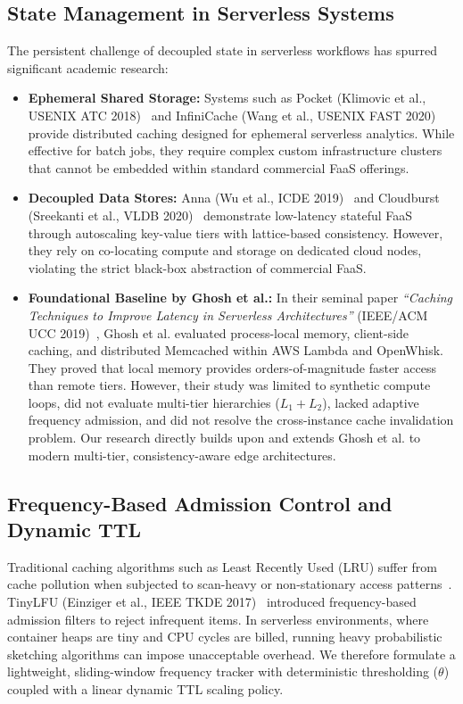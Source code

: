 \documentclass[conference]{IEEEtran}
\begin{document}
\subsection{State Management in Serverless Systems}
The persistent challenge of decoupled state in serverless workflows has spurred significant academic research:
\begin{itemize}
    \item \textbf{Ephemeral Shared Storage:} Systems such as Pocket (Klimovic et al., USENIX ATC 2018)~\cite{klimovic2018} and InfiniCache (Wang et al., USENIX FAST 2020)~\cite{wang2020infinicache} provide distributed caching designed for ephemeral serverless analytics. While effective for batch jobs, they require complex custom infrastructure clusters that cannot be embedded within standard commercial FaaS offerings.
    \item \textbf{Decoupled Data Stores:} Anna (Wu et al., ICDE 2019)~\cite{wu2019anna} and Cloudburst (Sreekanti et al., VLDB 2020)~\cite{sreekanti2020} demonstrate low-latency stateful FaaS through autoscaling key-value tiers with lattice-based consistency. However, they rely on co-locating compute and storage on dedicated cloud nodes, violating the strict black-box abstraction of commercial FaaS.
    \item \textbf{Foundational Baseline by Ghosh et al.:} In their seminal paper \textit{``Caching Techniques to Improve Latency in Serverless Architectures''} (IEEE/ACM UCC 2019)~\cite{ghosh2019}, Ghosh et al. evaluated process-local memory, client-side caching, and distributed Memcached within AWS Lambda and OpenWhisk. They proved that local memory provides orders-of-magnitude faster access than remote tiers. However, their study was limited to synthetic compute loops, did not evaluate multi-tier hierarchies ($L_1 + L_2$), lacked adaptive frequency admission, and did not resolve the cross-instance cache invalidation problem. Our research directly builds upon and extends Ghosh et al. to modern multi-tier, consistency-aware edge architectures.
\end{itemize}

\subsection{Frequency-Based Admission Control and Dynamic TTL}
Traditional caching algorithms such as Least Recently Used (LRU) suffer from cache pollution when subjected to scan-heavy or non-stationary access patterns~\cite{megiddo2003arc}. TinyLFU (Einziger et al., IEEE TKDE 2017)~\cite{einziger2017tinylfu} introduced frequency-based admission filters to reject infrequent items. In serverless environments, where container heaps are tiny and CPU cycles are billed, running heavy probabilistic sketching algorithms can impose unacceptable overhead. We therefore formulate a lightweight, sliding-window frequency tracker with deterministic thresholding ($\theta$) coupled with a linear dynamic TTL scaling policy.
\end{document}

